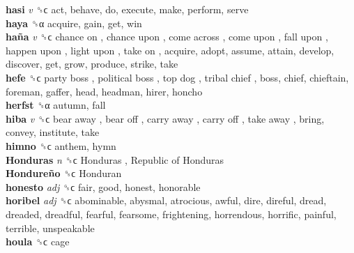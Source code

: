 \textbf{hasi} \emph{v}  ␝ϲ  act, behave, do, execute, make, perform, serve  \\
\textbf{haya} ␝α  acquire, gain, get, win  \\
\textbf{haña} \emph{v}  ␝ϲ   chance on ,  chance upon ,  come across ,  come upon ,  fall upon ,  happen upon ,  light upon ,  take on , acquire, adopt, assume, attain, develop, discover, get, grow, produce, strike, take  \\
\textbf{hefe} ␝ϲ   party boss ,  political boss ,  top dog ,  tribal chief , boss, chief, chieftain, foreman, gaffer, head, headman, hirer, honcho  \\
\textbf{herfst} ␝α  autumn, fall  \\
\textbf{hiba} \emph{v}  ␝ϲ   bear away ,  bear off ,  carry away ,  carry off ,  take away , bring, convey, institute, take  \\
\textbf{himno} ␝ϲ  anthem, hymn  \\
\textbf{Honduras} \emph{n}  ␝ϲ   Honduras ,  Republic of Honduras   \\
\textbf{Hondureño} ␝ϲ   Honduran   \\
\textbf{honesto} \emph{adj}  ␝ϲ  fair, good, honest, honorable  \\
\textbf{horibel} \emph{adj}  ␝ϲ  abominable, abysmal, atrocious, awful, dire, direful, dread, dreaded, dreadful, fearful, fearsome, frightening, horrendous, horrific, painful, terrible, unspeakable  \\
\textbf{houla} ␝ϲ  cage  \\
